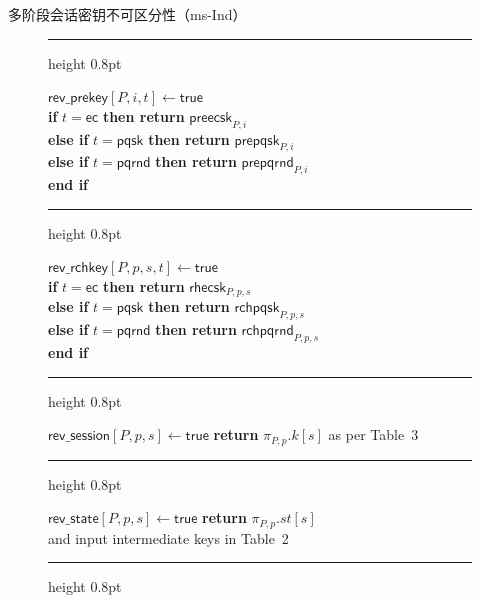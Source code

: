 \begin{definition}{多阶段会话密钥不可区分性（ms-Ind）}
\begin{figure}[htbp]
\begin{minipage}[t]{0.48\textwidth}
        \vspace{3mm}
        \hrule height 0.8pt
        \vspace{1mm}

        $\mathsf{rev\_prekey}[P,i,t] \gets \mathsf{true}$ \\
        \textbf{if} $t = \mathsf{ec}$ \textbf{then return} $\mathsf{preecsk}_{P,i}$ \\
        \textbf{else if} $t = \mathsf{pqsk}$ \textbf{then return} $\mathsf{prepqsk}_{P,i}$ \\
        \textbf{else if} $t = \mathsf{pqrnd}$ \textbf{then return} $\mathsf{prepqrnd}_{P,i}$ \\
        \textbf{end if}

        \vspace{3mm}
        \hrule height 0.8pt
        \vspace{1mm}

        $\mathsf{rev\_rchkey}[P,p,s,t] \gets \mathsf{true}$ \\
        \textbf{if} $t = \mathsf{ec}$ \textbf{then return} $\mathsf{rhecsk}_{P,p,s}$ \\
        \textbf{else if} $t = \mathsf{pqsk}$ \textbf{then return} $\mathsf{rchpqsk}_{P,p,s}$ \\
        \textbf{else if} $t = \mathsf{pqrnd}$ \textbf{then return} $\mathsf{rchpqrnd}_{P,p,s}$ \\
        \textbf{end if}

        \vspace{3mm}
        \hrule height 0.8pt
        \vspace{1mm}

        $\mathsf{rev\_session}[P,p,s] \gets \mathsf{true}$ \textbf{ return} $\pi_{P,p}.k[s]$ as per Table~3

        \vspace{3mm}
        \hrule height 0.8pt
        \vspace{1mm}

        $\mathsf{rev\_state}[P,p,s] \gets \mathsf{true}$ \textbf{ return} $\pi_{P,p}.st[s]$ \\
        and input intermediate keys in Table~2

        \vspace{3mm}
        \hrule height 0.8pt
        \vspace{1mm}


\end{minipage}
\end{figure}
\end{definition}
